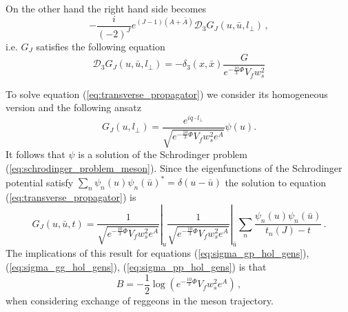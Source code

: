 \documentclass[a4paper,12pt]{article}
\begin{document}
On the other hand the right hand side becomes
\begin{equation}
- \frac{i}{{\left(-2\right)}^J} e^{\left(J-1\right)\left(A+\bar{A}\right)} \mathcal{D}_3 G_J \left(u, \bar{u}, l_\perp\right) \, ,
\end{equation}
i.e. $G_J$ satisfies the following equation
\begin{equation}
\mathcal{D}_3 G_J \left(u, \bar{u}, l_\perp\right) = - \delta_3 \left(x, \bar{x}\right) \frac{G}{e^{-\frac{10}{3} \Phi} V_f w_s^2}
\label{eq:transverse_propagator}
\end{equation}

To solve equation (\ref{eq:transverse_propagator}) we consider its homogeneous version and the following ansatz
\begin{equation}
G_J\left(u, l_\perp\right) = \frac{e^{i q \cdot l_\perp}}{\sqrt{e^{-\frac{10}{3}\Phi}V_f w_s^2 e^{A}}} \psi\left(u\right).
\end{equation}
It follows that $\psi$ is a solution of the Schrodinger problem (\ref{eq:schrodinger_problem_meson}).
Since the eigenfunctions of the Schrodinger potential satisfy $\sum_n \psi_n (u) {\psi_n (\bar{u})}^* = \delta(u - \bar{u})$
the solution to equation (\ref{eq:transverse_propagator}) is
\begin{equation}
G_J \left(u, \bar{u}, t \right) = \left. \frac{1}{\sqrt{e^{-\frac{10}{3}\Phi}V_f w_s^2 e^A}}\right|_u  \left.\frac{1}{\sqrt{e^{-\frac{10}{3}\Phi}V_f w_s^2 e^A}}\right|_{\bar{u}}  \sum_n \frac{\psi_n\left(u\right) \psi_n \left(\bar{u}\right)}{t_n\left(J\right) - t} \, .
\end{equation}
The implications of this result for equations (\ref{eq:sigma_gp_hol_gens}), (\ref{eq:sigma_gg_hol_gens}), (\ref{eq:sigma_pp_hol_gens}) is that 
\begin{equation}
B = - \frac{1}{2} \log\left( e^{-\frac{10}{3}\Phi}V_f w_s^2 e^A \right) \, ,
\end{equation}
when considering exchange of reggeons in the meson trajectory.
\end{document}
